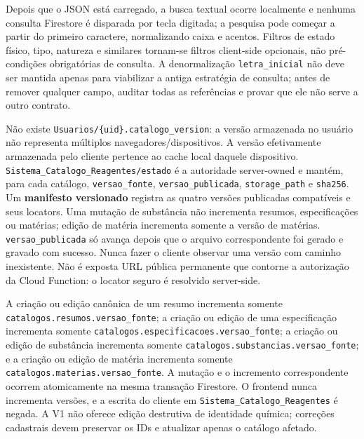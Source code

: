 \begin{regra}
Depois que o JSON está carregado, a busca textual ocorre localmente e nenhuma consulta Firestore é disparada por tecla digitada; a pesquisa pode começar a partir do primeiro caractere, normalizando caixa e acentos. Filtros de estado físico, tipo, natureza e similares tornam-se filtros client-side opcionais, não pré-condições obrigatórias de consulta. A denormalização \texttt{letra\_inicial} não deve ser mantida apenas para viabilizar a antiga estratégia de consulta; antes de remover qualquer campo, auditar todas as referências e provar que ele não serve a outro contrato.
\end{regra}

\begin{regra}
Não existe \texttt{Usuarios/\{uid\}.catalogo\_version}: a versão armazenada no usuário não representa múltiplos navegadores/dispositivos. A versão efetivamente armazenada pelo cliente pertence ao cache local daquele dispositivo. \texttt{Sistema\_Catalogo\_Reagentes/estado} é a autoridade server-owned e mantém, para cada catálogo, \texttt{versao\_fonte}, \texttt{versao\_publicada}, \texttt{storage\_path} e \texttt{sha256}. Um \textbf{manifesto versionado} registra as quatro versões publicadas compatíveis e seus locators. Uma mutação de substância não incrementa resumos, especificações ou matérias; edição de matéria incrementa somente a versão de matérias. \texttt{versao\_publicada} só avança depois que o arquivo correspondente foi gerado e gravado com sucesso. Nunca fazer o cliente observar uma versão com caminho inexistente. Não é exposta URL pública permanente que contorne a autorização da Cloud Function: o locator seguro é resolvido server-side.
\end{regra}

\begin{regra}
A criação ou edição canônica de um resumo incrementa somente \texttt{catalogos.resumos.versao\_fonte}; a criação ou edição de uma especificação incrementa somente \texttt{catalogos.especificacoes.versao\_fonte}; a criação ou edição de substância incrementa somente \texttt{catalogos.substancias.versao\_fonte}; e a criação ou edição de matéria incrementa somente \texttt{catalogos.materias.versao\_fonte}. A mutação e o incremento correspondente ocorrem atomicamente na mesma transação Firestore. O frontend nunca incrementa versões, e a escrita do cliente em \texttt{Sistema\_Catalogo\_Reagentes} é negada. A V1 não oferece edição destrutiva de identidade química; correções cadastrais devem preservar os IDs e atualizar apenas o catálogo afetado.
\end{regra}

